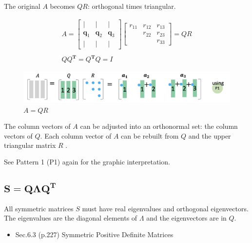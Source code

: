 \documentclass[letterpaper]{article}
\begin{document}
The original $A$ becomes $QR$: orthogonal times triangular.

\begin{gather*}
  A = 
  \begin{bmatrix}
    | & | & |\\
    \bm{q}_1 & \bm{q}_2 & \bm{q}_3\\
    | & | & |
  \end{bmatrix}
  \begin{bmatrix}
    r_{11} & r_{12} & r_{13}\\
           & r_{22} & r_{23}\\
           &        & r_{33}
  \end{bmatrix} = QR\\
  \\
  Q Q^\mathbf{T}=Q^\mathbf{T} Q = I
\end{gather*}

\begin{figure}[H]
  \includegraphics[keepaspectratio, width=\linewidth]{QR.png}
  \caption{$A=QR$}
\end{figure}

The column vectors of $A$ can be adjusted into an orthonormal set: the column vectors of $Q$.
Each column vector of $A$ can be rebuilt from $Q$ and the upper triangular matrix $R$ .

See Pattern 1 (P1) again for the graphic interpretation.


\clearpage

\subsection{$\boldsymbol{S=Q \Lambda Q^\mathbf{T}}$}

All symmetric matrices $S$ must have real eigenvalues and orthogonal eigenvectors.
The eigenvalues are the diagonal elements of $\Lambda$ and the eigenvectors are in $Q$. 

\begin{itemize}
  \item Sec.6.3 (p.227) Symmetric Positive Definite Matrices
\end{itemize}
\end{document}
